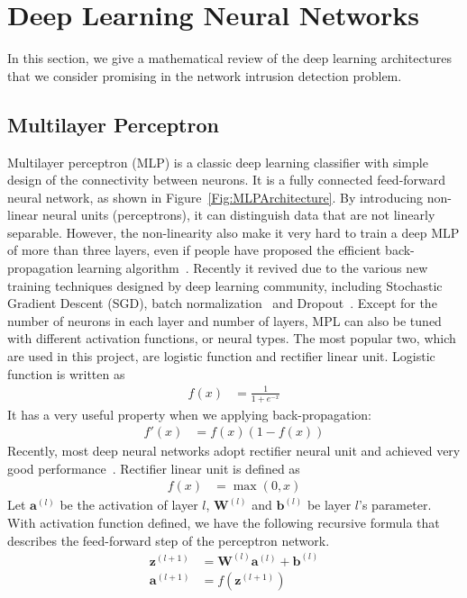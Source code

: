 \section{Deep Learning Neural Networks}
\label{Sec:Architectures}
In this section, we give a mathematical review of the deep learning architectures that
we consider promising in the network intrusion detection problem.

\subsection{Multilayer Perceptron}
Multilayer perceptron (MLP) is a classic deep learning classifier with simple
design of the connectivity between neurons.
It is a fully connected feed-forward neural network, as shown in Figure~\ref{Fig:MLPArchitecture}.
By introducing non-linear neural units (perceptrons), it can distinguish data that are
not linearly separable.
However, the non-linearity also make it very hard to train a deep MLP of more than three layers,
even if people have proposed the efficient back-propagation learning algorithm~\cite{Backpropagation}.
Recently it revived due to the various new training techniques designed by deep learning community,
including Stochastic Gradient Descent (SGD),
batch normalization~\cite{BatchNorm} and Dropout~\cite{Dropout}.
Except for the number of neurons in each layer and number of layers,
MPL can also be tuned with different activation functions, or neural types.
The most popular two, which are used in this project, are logistic function
and rectifier linear unit.
Logistic function is written as
\begin{align}
    f(x) &= \frac{1}{1 + e^{-x}}
\end{align}
It has a very useful property when we applying back-propagation:
\begin{align}
    f'(x) &= f(x) (1-f(x))
\end{align}
Recently, most deep neural networks adopt rectifier neural unit and
achieved very good performance~\cite{DeepLearning}.
Rectifier linear unit is defined as
\begin{align}
    f(x) &= \max(0, x)
\end{align}
Let $\mathbf{a}^{(l)}$ be the activation of layer $l$,
$\mathbf{W}^{(l)}$ and $\mathbf{b}^{(l)}$ be layer $l$'s parameter.
With activation function defined, we have the following recursive formula that describes
the feed-forward step of the perceptron network.
\begin{align}
    \mathbf{z}^{(l+1)} &= \mathbf{W}^{(l)} \mathbf{a}^{(l)} + \mathbf{b}^{(l)} \label{Equ:MLPFeedForward1}\\
    \mathbf{a}^{(l+1)} &= f(\mathbf{z}^{(l+1)})
    \label{Equ:MLPFeedForward2}
\end{align}

